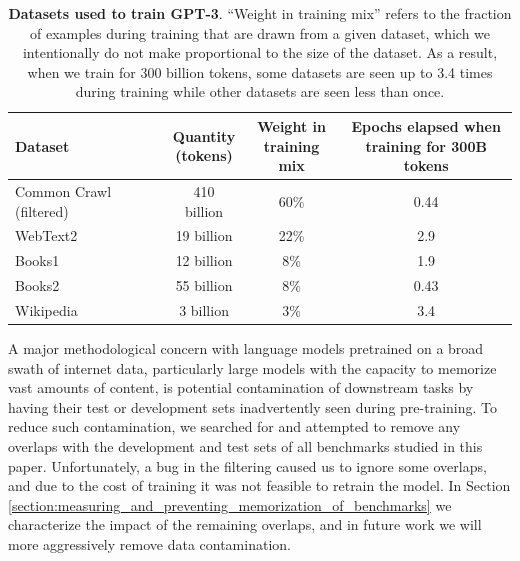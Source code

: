 \documentclass{article}
\begin{document}
\begin{table}

    \begin{center}
        \begin{tabular}{lccc}
        \toprule
        Dataset & \shortstack{Quantity \\ (tokens)} & \shortstack{Weight in \\training mix} & \shortstack{Epochs elapsed when \\ training for 300B tokens} \\ 
        \midrule
        Common Crawl (filtered) & 410 billion & 60\% & 0.44\\ 
        WebText2 & 19 billion & 22\% &  2.9 \\
        Books1 & 12 billion & 8\% & 1.9 \\ 
        Books2 & 55 billion & 8\% & 0.43 \\ 
        Wikipedia & 3 billion & 3\% & 3.4 \\ 
        \bottomrule
        \end{tabular}
    \end{center}
    \caption{\textbf{Datasets used to train GPT-3}.  ``Weight in training mix'' refers to the fraction of examples during training that are drawn from a given dataset, which we intentionally do not make proportional to the size of the dataset.  As a result, when we train for 300 billion tokens, some datasets are seen up to 3.4 times during training while other datasets are seen less than once.}
    \label{table:dataset}
\end{table}

A major methodological concern with language models pretrained on a broad swath of internet data, particularly large models with the capacity to memorize vast amounts of content, is potential contamination of downstream tasks by having their test or development sets inadvertently seen during pre-training.  To reduce such contamination, we searched for and attempted to remove any overlaps with the development and test sets of all benchmarks studied in this paper.  Unfortunately, a bug in the filtering caused us to ignore some overlaps, and due to the cost of training it was not feasible to retrain the model. In Section \ref{section:measuring_and_preventing_memorization_of_benchmarks} we characterize the impact of the remaining overlaps, and in future work we will more aggressively remove data contamination. 
\end{document}
